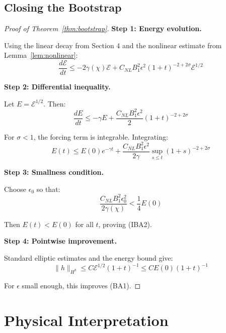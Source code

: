 \documentclass[12pt,a4paper]{article}
\begin{document}
\subsection{Closing the Bootstrap}

\begin{proof}[Proof of Theorem~\ref{thm:bootstrap}]
\textbf{Step 1: Energy evolution.}

Using the linear decay from Section 4 and the nonlinear estimate from Lemma~\ref{lem:nonlinear}:
\begin{equation}
\frac{d\mathcal{E}}{dt} \leq -2\gamma(\chi)\mathcal{E} + C_{NL}B_1^2\epsilon^2(1+t)^{-2+2\sigma}\mathcal{E}^{1/2}
\end{equation}

\textbf{Step 2: Differential inequality.}

Let $E = \mathcal{E}^{1/2}$. Then:
\begin{equation}
\frac{dE}{dt} \leq -\gamma E + \frac{C_{NL}B_1^2\epsilon^2}{2}(1+t)^{-2+2\sigma}
\end{equation}

For $\sigma < 1$, the forcing term is integrable. Integrating:
\begin{equation}
E(t) \leq E(0)e^{-\gamma t} + \frac{C_{NL}B_1^2\epsilon^2}{2\gamma}\sup_{s \leq t}(1+s)^{-2+2\sigma}
\end{equation}

\textbf{Step 3: Smallness condition.}

Choose $\epsilon_0$ so that:
\begin{equation}
\frac{C_{NL}B_1^2\epsilon_0^2}{2\gamma(\chi)} < \frac{1}{4}E(0)
\end{equation}

Then $E(t) < E(0)$ for all $t$, proving (IBA2).

\textbf{Step 4: Pointwise improvement.}

Standard elliptic estimates and the energy bound give:
\begin{equation}
\|h\|_{H^8} \leq C\mathcal{E}^{1/2}(1+t)^{-1} \leq CE(0)(1+t)^{-1}
\end{equation}

For $\epsilon$ small enough, this improves (BA1).
\end{proof}

\section{Physical Interpretation}
\end{document}

